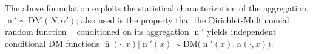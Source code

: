 \documentclass[12pt]{report}
\DeclareMathOperator{\xrm}{\mathrm{x}}
\DeclareMathOperator{\yrm}{\mathrm{y}}
\DeclareMathOperator{\nrm}{\mathrm{n}}
\DeclareMathOperator{\nbarrm}{\bar{\mathrm{n}}}
\DeclareMathOperator{\Prm}{\mathrm{P}}
\DeclareMathOperator{\Erm}{\mathrm{E}}
\DeclareMathOperator{\Xcal}{\mathcal{X}}
\DeclareMathOperator{\Ycal}{\mathcal{Y}}
\DeclareMathOperator{\Ncal}{\mathcal{N}}
\begin{document}
The above formulation exploits the statistical characterization of the aggregation, $\nrm' \sim \mathrm{DM}(N,\alpha')$; also used is the property that the Dirichlet-Multinomial random function $\nbarrm$ conditioned on its aggregation $\nrm'$ yields independent  conditional DM functions $\bar{\nrm}(\cdot,x) | \nrm'(x) \sim \mathrm{DM}\big( \nrm'(x),\alpha(\cdot,x) \big)$.
\end{document}
